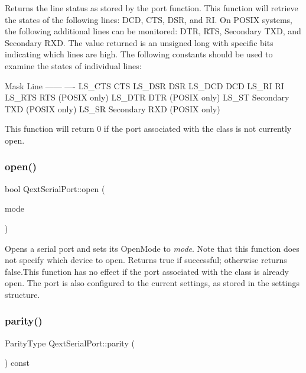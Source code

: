Returns the line status as stored by the port function. This function will retrieve the states of the following lines\+: D\+CD, C\+TS, D\+SR, and RI. On P\+O\+S\+IX systems, the following additional lines can be monitored\+: D\+TR, R\+TS, Secondary T\+XD, and Secondary R\+XD. The value returned is an unsigned long with specific bits indicating which lines are high. The following constants should be used to examine the states of individual lines\+:


\begin{DoxyCode}
Mask        Line
------      ----
LS\_CTS      CTS
LS\_DSR      DSR
LS\_DCD      DCD
LS\_RI       RI
LS\_RTS      RTS (POSIX only)
LS\_DTR      DTR (POSIX only)
LS\_ST       Secondary TXD (POSIX only)
LS\_SR       Secondary RXD (POSIX only)
\end{DoxyCode}


This function will return 0 if the port associated with the class is not currently open. \mbox{\label{classQextSerialPort_a86720bd25b34082c1270b7e42c2216a0}} 
\subsubsection{\texorpdfstring{open()}{open()}}
{\footnotesize\ttfamily bool Qext\+Serial\+Port\+::open (\begin{DoxyParamCaption}\item[{Open\+Mode}]{mode }\end{DoxyParamCaption})}

Opens a serial port and sets its Open\+Mode to {\itshape mode}. Note that this function does not specify which device to open. Returns true if successful; otherwise returns false.\+This function has no effect if the port associated with the class is already open. The port is also configured to the current settings, as stored in the settings structure. \mbox{\label{classQextSerialPort_a76f94dbf2ebb40bcd2b784c38974075f}} 
\subsubsection{\texorpdfstring{parity()}{parity()}}
{\footnotesize\ttfamily Parity\+Type Qext\+Serial\+Port\+::parity (\begin{DoxyParamCaption}{ }\end{DoxyParamCaption}) const}

